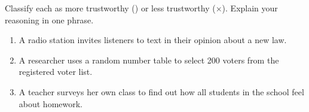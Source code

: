 \documentclass[10pt]{article}
\begin{document}
\vspace{0.1in}

\begin{practicebox}
\small Classify each as more trustworthy (\checkmark) or less trustworthy ($\times$).
Explain your reasoning in one phrase.

\vspace{6pt}
\begin{enumerate}[leftmargin=1.5em, itemsep=10pt]
  \item A radio station invites listeners to text in their opinion about a new law.
        \blank{1cm} \quad \blank{9cm}

  \item A researcher uses a random number table to select 200 voters from the
        registered voter list. \blank{1cm} \quad \blank{8cm}

  \item A teacher surveys her own class to find out how all students in the school
        feel about homework. \blank{1cm} \quad \blank{7cm}
\end{enumerate}
\end{practicebox}
\end{document}
